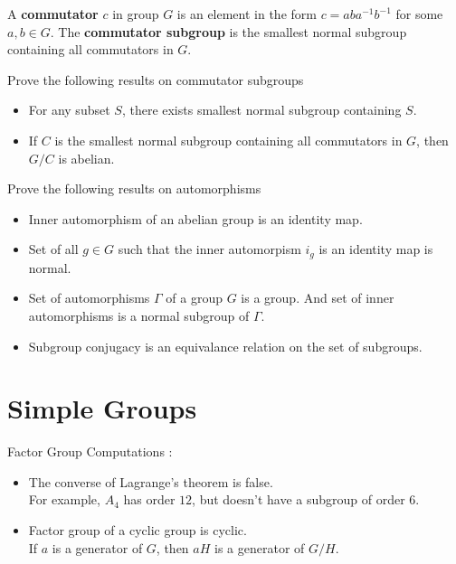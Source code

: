 \begin{definition}
	A \textbf{commutator} $c$ in group $G$ is an element in the form $c = aba^{-1}b^{-1}$ for some $a,b \in G$.
	The \textbf{commutator subgroup} is the smallest normal subgroup containing all commutators in $G$.
\end{definition}

\begin{remark}Prove the following results on commutator subgroups 
	\begin{itemize}
		\item For any subset $S$, there exists smallest normal subgroup containing $S$. %
		\item If $C$ is the smallest normal subgroup containing all commutators in $G$, then $G/C$ is abelian.%
	\end{itemize}
\end{remark}

\begin{remark}Prove the following results on automorphisms 
	\begin{itemize}
		\item Inner automorphism of an abelian group is an identity map.%
		\item Set of all $g \in G$ such that the inner automorpism $i_g$ is an identity map is normal. %
		\item Set of automorphisms $\Gamma$ of a group $G$ is a group.
			And set of inner automorphisms is a normal subgroup of $\Gamma$.
		\item Subgroup conjugacy is an equivalance relation on the set of subgroups. %
	\end{itemize}
\end{remark}

\section{Simple Groups}
\begin{remark}Factor Group Computations :
	\begin{itemize}
		\item The converse of Lagrange's theorem is false.\\
			For example, $A_4$ has order $12$, but doesn't have a subgroup of order $6$.
		\item Factor group of a cyclic group is cyclic.\\
			If $a$ is a generator of $G$, then $aH$ is a generator of $G/H$.
	\end{itemize}
\end{remark}

